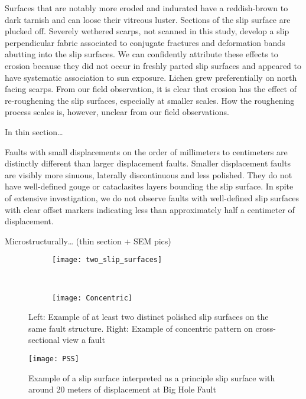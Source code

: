 \documentclass[12pt,a4paper]{article}
\begin{document}
{Surfaces that are notably more eroded and indurated have a reddish-brown to dark tarnish and can loose their vitreous luster. Sections of the slip surface are plucked off. Severely wethered scarps, not scanned in this study, develop a slip perpendicular fabric associated to conjugate fractures and deformation bands abutting into the slip surfaces. We can confidently attribute these effects to erosion because they did not occur in freshly parted slip surfaces and appeared to have systematic association to sun exposure. Lichen grew preferentially on north facing scarps. From our field observation, it is clear that erosion has the effect of re-roughening the slip surfaces, especially at smaller scales. How the roughening process scales is, however, unclear from our field observations.

In thin section…

Faults with small displacements on the order of millimeters to centimeters are distinctly different than larger displacement faults. Smaller displacement faults are visibly more sinuous, laterally discontinuous and less polished.  They do not have well-defined gouge or cataclasites layers bounding the slip surface. In spite of extensive investigation, we do not observe faults with well-defined slip surfaces with clear offset markers indicating less than approximately half a centimeter of displacement. 

Microstructurally… (thin section + SEM pics)

\begin{figure}
	\centering
	\begin{subfigure}[b]{0.4\textwidth}
		\texttt{[image: two\_slip\_surfaces]}
	\end{subfigure}
	~
	\begin{subfigure}[b]{0.4\textwidth}
		\texttt{[image: Concentric]}
	\end{subfigure}
	\caption{Left: Example of at least two distinct polished slip surfaces on the same fault structure. Right: Example of concentric pattern on cross-sectional view a fault}
	\label{many_surf}
\end{figure}	

\begin{figure}
	\centering
    \texttt{[image: PSS]}
	
	\caption{Example of a slip surface interpreted as a principle slip surface with around 20 meters of displacement at Big Hole Fault}
	\label{PSS}
\end{figure}

}
\end{document}
